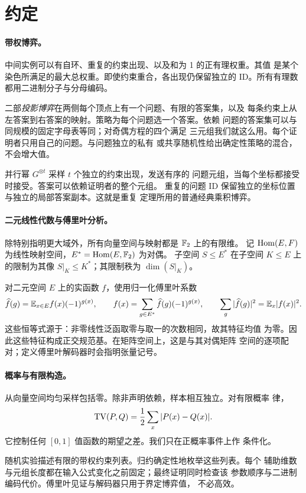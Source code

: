\section{约定}\label{sec:preliminaries}

\paragraph{带权博弈。}
中间实例可以有自环、重复的约束出现、以及和为 1 的正有理权重。其值
是某个染色所满足的最大总权重。即使约束重合，各出现仍保留独立的
ID。所有有理数都用二进制分子与分母编码。

二部\emph{投影博弈}在两侧每个顶点上有一个问题、有限的答案集，以及
每条约束上从左答案到右答案的映射。策略为每个问题选一个答案。依赖
问题的答案集可以与同规模的固定字母表等同；对奇偶方程的四个满足
三元组我们就这么用。每个证明者只用自己的问题。与问题独立的私有
或共享随机性给出确定性策略的混合，不会增大值。

并行幂 \(G^{\otimes t}\) 采样 \(t\) 个独立的约束出现，发送有序的
问题元组，当每个坐标都接受时接受。答案可以依赖证明者的整个元组。
重复的问题 ID 保留独立的坐标位置与独立的局部答案副本。这就是重复
定理所用的普通经典乘积博弈。

\paragraph{二元线性代数与傅里叶分析。}
除特别指明更大域外，所有向量空间与映射都是 \(\mathbb F_2\) 上的有限维。
记 \(\operatorname{Hom}(E,F)\) 为线性映射空间，\(E^*=\operatorname{Hom}(E,\mathbb F_2)\) 为对偶。
子空间 \(S\le E^*\) 在子空间 \(K\le E\) 上的限制为其像
\(S|_K\le K^*\)；其限制秩为 \(\dim(S|_K)\)。

对二元空间 \(E\) 上的实函数 \(f\)，使用归一化傅里叶系数
\[
 \widehat f(g)=\mathbb E_{x\in E}f(x)(-1)^{g(x)},\qquad
 f(x)=\sum_{g\in E^*}\widehat f(g)(-1)^{g(x)},\qquad
 \sum_g|\widehat f(g)|^2=\mathbb E_x|f(x)|^2.
\]
这些恒等式源于：非零线性泛函取零与取一的次数相同，故其特征均值
为零。因此这些特征构成正交规范基。在矩阵空间上，这是与其对偶矩阵
空间的逐项配对；定义傅里叶解码器时会指明张量记号。

\paragraph{概率与有限构造。}
从向量空间均匀采样包括零。除非声明依赖，样本相互独立。对有限概率
律，
\[
 \operatorname{TV}(P,Q)=\frac12\sum_x|P(x)-Q(x)|.
\]
它控制任何 \([0,1]\) 值函数的期望之差。我们只在正概率事件上作
条件化。

随机实验描述有限的带权约束列表。归约确定性地枚举这些列表。每个
辅助维数与元组长度都在输入公式变化之前固定；最终证明同时检查该
参数顺序与二进制编码代价。傅里叶见证与解码器只用于界定博弈值，
不必高效。
